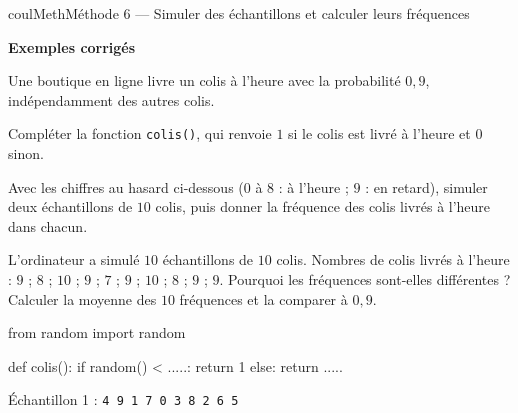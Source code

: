 \documentclass[11pt,a4paper]{article}
\makeatletter
\newcounter{lycee@signet}
\newcommand{\signet}[3][]{\stepcounter{lycee@signet}%
  \edef\lycee@dest{\if\relax\detokenize{#1}\relax
    signet.\arabic{lycee@signet}\else#1\fi}%
  \hypertarget{\lycee@dest}{}\bookmark[level=#2,dest=\lycee@dest]{#3}}
\newcounter{methode}
\newenvironment{methodebox}[1][Méthode]{\stepcounter{methode}%
  \begin{boitecours}[phantom={\signet[methode-\arabic{methode}]{2}{#1}}]{coulMeth}{#1}}%
  {\end{boitecours}}
\newcommand{\etape}[1]{\par\smallskip\textbf{\color{coulMeth}#1}\par\nobreak\smallskip}
\newcommand{\etapeexemples}{\etape{Exemples corrigés}}
\makeatother
\begin{document}
\begin{methodebox}[Méthode 6 --- Simuler des échantillons et calculer leurs fréquences]
\etapeexemples
Une boutique en ligne livre un colis à l'heure avec la probabilité $0{,}9$,
indépendamment des autres colis.
\begin{questions}[label=\alph*)]
  \item Compléter la fonction \texttt{colis()}, qui renvoie $1$ si le colis est livré à
        l'heure et $0$ sinon.
  \item Avec les chiffres au hasard ci-dessous ($0$ à $8$ : à l'heure ; $9$ : en retard),
        simuler deux échantillons de $10$ colis, puis donner la fréquence des colis
        livrés à l'heure dans chacun.
  \item L'ordinateur a simulé $10$ échantillons de $10$ colis. Nombres de colis livrés à
        l'heure : $9$ ; $8$ ; $10$ ; $9$ ; $7$ ; $9$ ; $10$ ; $8$ ; $9$ ; $9$. Pourquoi les
        fréquences sont-elles différentes ? Calculer la moyenne des $10$ fréquences et la
        comparer à $0{,}9$.
\end{questions}
\begin{minipage}[t]{0.42\linewidth}\vspace{0pt}
\begin{python}
from random import random

def colis():
    if random() < .....:
        return 1
    else:
        return .....
\end{python}
\end{minipage}\hfill
\begin{minipage}[t]{0.54\linewidth}\vspace{0pt}\raggedright
Échantillon 1 : \texttt{4 9 1 7 0 3 8 2 6 5}


\end{minipage}
\end{methodebox}
\end{document}
